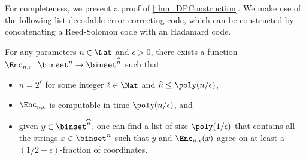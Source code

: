\documentclass{toc}
\begin{document}
For completeness, we present a proof of \cref{thm_DPConstruction}.
We make use of the following list-decodable error-correcting code,
which can be constructed by concatenating a Reed-Solomon code with an Hadamard code.
\begin{lemma}
  \label{lemma_ListDecodable}
  For any parameters $n \in \Nat$ and $\epsilon > 0$,
  there exists a function $\Enc_{n, \epsilon} \colon \binset^n \to \binset^{\widehat{n}}$ such that
  \begin{itemize}
    \item
          $\widehat{n} = 2^\ell$ for some integer $\ell \in \Nat$ and $\widehat{n} \le \poly(n / \epsilon)$,
    \item
          $\Enc_{n, \epsilon}$ is computable in time $\poly(n / \epsilon)$, and
    \item
          given $y \in \binset^{\widehat{n}}$,
          one can find a list of size $\poly(1 / \epsilon)$
          that contains all the strings $x \in \binset^n$ such that $y$ and $\Enc_{n, \epsilon}(x)$ agree on at least a $(1 / 2 + \epsilon)$-fraction of coordinates.
  \end{itemize}
\end{lemma}
\end{document}
